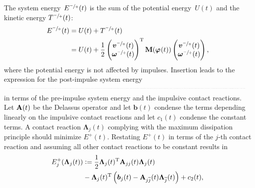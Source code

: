 \documentclass[global,twocolumn]{svjour}
\let\vec\bm
\newcommand{\mat}[1]{{\bf #1}}
\newcommand{\dvect}[2]{\ensuremath{\begin{pmatrix}#1\\#2\end{pmatrix}}}
\newcommand{\transp}{{\mathrm{T}}}
\newcommand{\orient} [1]{\ensuremath{\vec{\varphi}_{#1}}}
\newcommand{\linvel} [1]{\ensuremath{\vec{v}_{#1}}}
\newcommand{\angvel} [1]{\ensuremath{\vec{\omega}_{#1}}}
\newcommand{\linimp}   [1]{\ensuremath{\vec{\Delta p}_{#1}}}
\newcommand{\angimp}   [1]{\ensuremath{\vec{\Delta L}_{#1}}}
\newcommand{\contactimpulse}[1]{\ensuremath{\vec{\Lambda}_{#1}}}
\newcommand{\shrinkeqnnew}[2]{\resizebox{#1\linewidth}{!}{\begin{varwidth}[t]{2\linewidth}\ensuremath{\displaystyle{#2}}\end{varwidth}}}
\begin{document}
		The system energy~$E^{\sfrac{-}{+}}(t)$ is the sum of the potential
		energy~$U(t)$ and the kinetic energy $T^{\sfrac{-}{+}}(t)$:
		\begin{equation*}
			\begin{split}
				E^{\sfrac{-}{+}}(t) & = U(t) + T^{\sfrac{-}{+}}(t)\\
					& = U(t) + \frac{1}{2} \dvect{\linvel{}^{\sfrac{-}{+}}(t)}{\angvel{}^{\sfrac{-}{+}}(t)}^\transp \mat{M}(\orient{}(t)) \dvect{\linvel{}^{\sfrac{-}{+}}(t)}{\angvel{}^{\sfrac{-}{+}}(t)},
			\end{split}
		\end{equation*}
		where the potential energy is not affected by impulses. Insertion
		leads to the expression for the post-impulse system energy
		\begin{equation*}
			\shrinkeqnnew{1}{
			\begin{split}
				E^+(t) & = E^-(t) + \frac{1}{2} \contactimpulse{}(t)^\transp \mat{W}(t)^\transp \mat{M}(\orient{}(t))^{-1} \mat{W}(t) \contactimpulse{}(t) \\
				       & \hspace{-0.75cm} + \contactimpulse{}(t)^\transp \mat{W}(t)^\transp \left( \dvect{\linvel{}^-(t)}{\angvel{}^-(t)} + \mat{M}(\orient{}(t))^{-1} \dvect{\linimp{ext}(t)}{\angimp{ext}(t)} \right) \\
				       & \hspace{-0.75cm} + \dvect{\linimp{ext}(t)}{\angimp{ext}(t)}^\transp \left( \dvect{\linvel{}^-(t)}{\angvel{}^-(t)} + \frac{1}{2} \mat{M}(\orient{}(t))^{-1} \dvect{\linimp{ext}(t)}{\angimp{ext}(t)} \right) \\
				       & \hspace{-0.75cm} = \frac{1}{2} \contactimpulse{}(t)^\transp \mat{A}(t) \contactimpulse{}(t) - \contactimpulse{}(t)^\transp \vec b(t) + c_1(t)
			\end{split}
			}
		\end{equation*}
		in terms of the pre-impulse system energy and the impulsive contact
		reactions. Let $\mat{A}(t)$ be the Delassus	operator and let $\vec b(t)$
		condense the terms depending linearly on the impulsive contact reactions
		and let $c_1(t)$ condense the constant terms. A contact reaction
		$\contactimpulse{j}(t)$ complying with the maximum dissipation principle
		should minimize $E^+(t)$. Restating $E^+(t)$ in terms of the $j$-th
		contact reaction and assuming all other contact reactions to be constant results in
		\begin{equation*}
			\begin{split}
				E_j^+(\contactimpulse{j}(t)) & := \frac{1}{2} \contactimpulse{j}(t)^\transp \mat{A}_{jj}(t) \contactimpulse{j}(t) \\
				                             & - \contactimpulse{j}(t)^\transp \left( \vec b_j(t) - \mat{A}_{j\overline{j}}(t) \contactimpulse{\overline{j}}(t) \right) + c_2(t),
			\end{split}
		\end{equation*}
\end{document}
